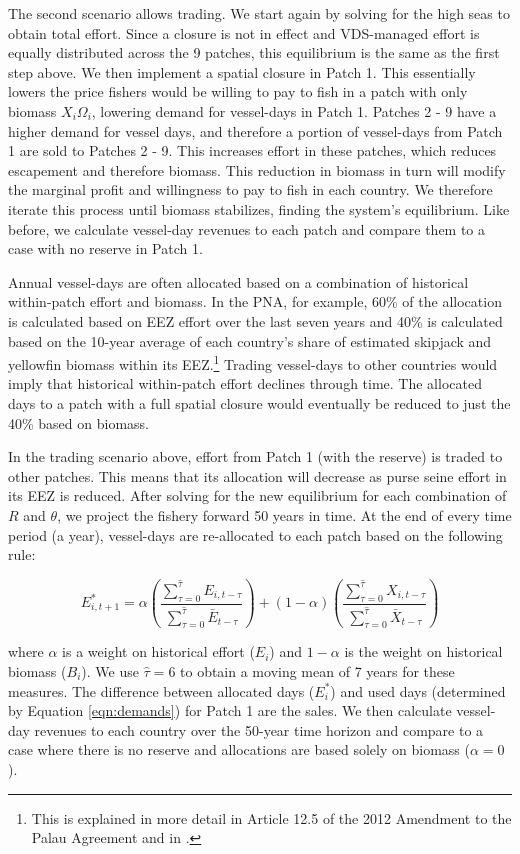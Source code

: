 \documentclass[12pt]{article}
\begin{document}
The second scenario allows trading. We start again by solving for the high seas to obtain total effort. Since a closure is not in effect and VDS-managed effort is equally distributed across the 9 patches, this equilibrium is the same as the first step above. We then implement a spatial closure in Patch 1. This essentially lowers the price fishers would be willing to pay to fish in a patch with only biomass $X_i\Omega_i$, lowering demand for vessel-days in Patch 1. Patches 2 - 9 have a higher demand for vessel days, and therefore a portion of vessel-days from Patch 1 are sold to Patches 2 - 9. This increases effort in these patches, which reduces escapement and therefore biomass. This reduction in biomass in turn will modify the marginal profit and willingness to pay to fish in each country. We therefore iterate this process until biomass stabilizes, finding the system's equilibrium. Like before, we calculate vessel-day revenues to each patch and compare them to a case with no reserve in Patch 1.

Annual vessel-days are often allocated based on a combination of historical within-patch effort and biomass. In the PNA, for example, 60\% of the allocation is calculated based on EEZ effort over the last seven years and 40\% is calculated based on the 10-year average of each country’s share of estimated skipjack and yellowfin biomass within its EEZ.\footnote{This is explained in more detail in Article 12.5 of the 2012 Amendment to the Palau Agreement and in \cite{Hagrannsoknir2014}.} Trading vessel-days to other countries would imply that historical within-patch effort declines through time. The allocated days to a patch with a full spatial closure would eventually be reduced to just the 40\% based on biomass.

In the trading scenario above, effort from Patch 1 (with the reserve) is traded to other patches. This means that its allocation will decrease as purse seine effort in its EEZ is reduced. After solving for the new equilibrium for each combination of $R$ and $\theta$, we project the fishery forward 50 years in time. At the end of every time period (a year), vessel-days are re-allocated to each patch based on the following rule:

$$
E_{i,t+1}^* = \alpha
\left(\frac{\sum_{\tau = 0}^{\hat{\tau}}E_{i,t-\tau}}{\sum_{\tau = 0}^{\hat{\tau}}\bar{E}_{{t-\tau}}}
	\right)
	+
(1 - \alpha)
\left(\frac{\sum_{\tau = 0}^{\hat{\tau}}X_{i,t-\tau}}{\sum_{\tau = 0}^{\hat{\tau}}\bar{X}_{t-\tau}} \right)
$$

\noindent where $\alpha$ is a weight on historical effort ($E_i$) and $1-\alpha$ is the weight on historical biomass ($B_i$). We use $\hat{\tau}= 6$ to obtain a moving mean of 7 years for these measures. The difference between allocated days ($E_i^*$) and used days (determined by Equation \ref{eqn:demands}) for Patch 1 are the sales. We then calculate vessel-day revenues to each country over the 50-year time horizon and compare to a case where there is no reserve and allocations are based solely on biomass ($\alpha = 0$).
\end{document}
